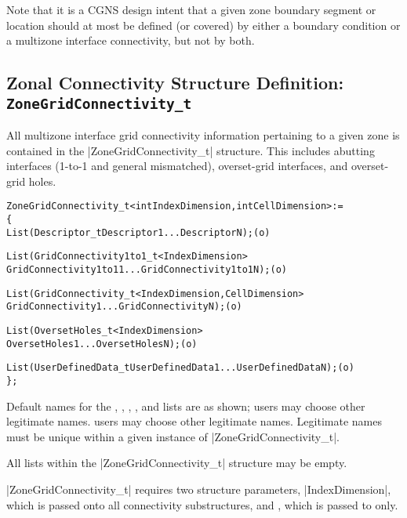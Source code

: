 Note that it is a CGNS design intent that a given zone boundary segment
or location should at most be defined (or covered) by either a boundary
condition or a multizone interface connectivity, but not by both.

\subsection{Zonal Connectivity Structure Definition: \texttt{ZoneGridConnectivity\_t}} 
\label{s:ZoneGridConnectivity}

All multizone interface grid connectivity information pertaining to
a given zone is contained in the |ZoneGridConnectivity_t| structure.
This includes abutting interfaces (1-to-1 and general mismatched),
overset-grid interfaces, and overset-grid holes.

\begin{alltt}
  ZoneGridConnectivity\_t< int IndexDimension, int CellDimension > :=
    \{
    List( Descriptor\_t Descriptor1 ... DescriptorN ) ;                      (o)

    List( GridConnectivity1to1\_t<IndexDimension>
          GridConnectivity1to11 ... GridConnectivity1to1N ) ;               (o)

    List( GridConnectivity\_t<IndexDimension, CellDimension>
          GridConnectivity1 ... GridConnectivityN ) ;                       (o)

    List( OversetHoles\_t<IndexDimension> 
          OversetHoles1 ... OversetHolesN ) ;                               (o)

    List( UserDefinedData\_t UserDefinedData1 ... UserDefinedDataN ) ;       (o)
    \} ;
\end{alltt}

\begin{notes}
\item
 Default names for the , ,
 , , and
 lists are as shown; users may choose other legitimate names.
 users may choose other legitimate names.  Legitimate names must be unique 
 within a given instance of |ZoneGridConnectivity_t|.
\item
 All lists within the |ZoneGridConnectivity_t| structure may be empty.
\end{notes}

|ZoneGridConnectivity_t| requires two structure parameters,
|IndexDimension|, which is passed onto all connectivity substructures, and
, which is passed to  only.

